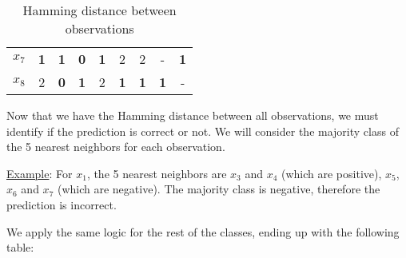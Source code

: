 \documentclass[12pt]{article}
\begin{document}
\begin{enumerate}[leftmargin=\labelsep]
\begin{table}[H]
\begin{center}
\begin{tabular}{c|cccccccc}
                $x_7$ & \textbf{\textcolor{codeblue}{1}} & \textbf{\textcolor{codeblue}{1}} & \textbf{\textcolor{codeblue}{0}} & \textbf{\textcolor{codeblue}{1}} & 2 & 2 & \-- & \textbf{\textcolor{codeblue}{1}} \\ 
                $x_8$ & 2 & \textbf{\textcolor{codeblue}{0}} & \textbf{\textcolor{codeblue}{1}} & 2 & \textbf{\textcolor{codeblue}{1}} & \textbf{\textcolor{codeblue}{1}} & \textbf{\textcolor{codeblue}{1}} & \-- \\ 
            \end{tabular}
            \caption{Hamming distance between observations}
        \end{center}
    \end{table}

    Now that we have the Hamming distance between all observations, we must identify if the prediction is correct or not. We will consider the majority class of the 5 nearest neighbors for each observation.
    
    \vspace{10pt}
    \underline{Example}: For $x_1$, the 5 nearest neighbors are $x_3$ and $x_4$ (which are positive), $x_5$, $x_6$ and $x_7$ (which are negative). The majority class is negative, therefore the prediction is incorrect.
    
    \newpage
    We apply the same logic for the rest of the classes, ending up with the following table:


\end{enumerate}
\end{document}
